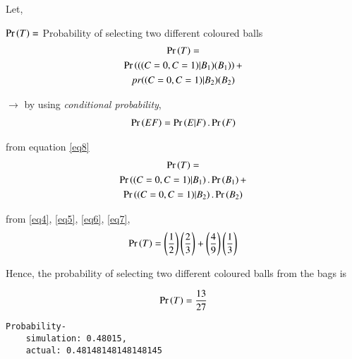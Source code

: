 \documentclass[journal,12pt,twocolumn]{IEEEtran}
\begin{document}
Let, 

\vspace{0.05in}

$\Pr\left(T\right)=$ Probability of selecting two different coloured balls
\begin{multline}
    \Pr\left(T\right)=\\
    \Pr\left(((C=0,C=1)|B_1)(B_1)\right)+\\
    pr{((C=0,C=1)|B_2)(B_2)}
\end{multline}

$\rightarrow$ by using \textit{conditional probability}, 
\begin{align}\label{eq8}
    \Pr\left(E F\right)=\Pr\left(E|F\right).\Pr\left(F\right)
\end{align}

from equation \eqref{eq8}
\begin{multline}
    \Pr\left(T\right)=\\
    \Pr\left((C=0,C=1)|B_1\right).\Pr\left(B_1\right)+\\
    \Pr\left((C=0,C=1)|B_2\right).\Pr\left(B_2\right)
\end{multline}

from \eqref{eq4}, \eqref{eq5}, \eqref{eq6}, \eqref{eq7},
\begin{align}
    \Pr\left(T\right)=\left(\frac{1}{2}\right)\left(\frac{2}{3}\right)+\left(\frac{4}{9}\right)\left(\frac{1}{3}\right)
\end{align}

Hence, the probability of selecting two different coloured balls from the bags is

\begin{align}
    \Pr\left(T\right)=\frac{13}{27}
\end{align}

\vspace{0.2in}

\begin{lstlisting}
Probability-
    simulation: 0.48015,
    actual: 0.48148148148148145
\end{lstlisting}
\end{document}
